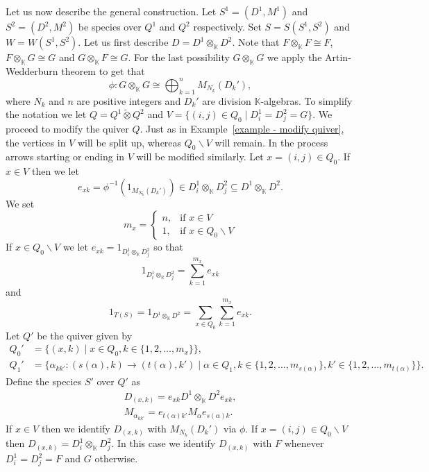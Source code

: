 \documentclass[a4paper, reqno]{amsart}
\theoremstyle{definition}
\newcommand{\K}{\mathbb{K}}
\begin{document}
Let us now describe the general construction. Let $S^1 = (D^1, M^1)$ and $S^2 = (D^2, M^2)$ be species over $Q^1$ and $Q^2$ respectively. Set $S = S(S^1, S^2)$ and $W = W(S^1, S^2)$. Let us first describe $D = D^1\otimes_\K D^2$. Note that $F\otimes_\K F \cong F$, $F\otimes_\K G\cong G$ and $G\otimes_\K F\cong G$. For the last possibility $G\otimes_\K G$ we apply the Artin-Wedderburn theorem to get that
\begin{equation*}
	\phi: G\otimes_\K G \cong \bigoplus_{k=1}^nM_{N_k}(D_k'),
\end{equation*}
where $N_k$ and $n$ are positive integers and $D_k'$ are division $\K$-algebras. To simplify the notation we let $Q = Q^1\tilde{\otimes}Q^2$ and $V = \{(i, j)\in Q_0 \mid D_i^1 = D_j^2 = G\}$. We proceed to modify the quiver $Q$. Just as in Example~\ref{example - modify quiver}, the vertices in $V$ will be split up, whereas $Q_0\backslash V$ will remain. In the process arrows starting or ending in $V$ will be modified similarly. Let $x = (i, j)\in Q_0$. If $x\in V$ then we let
\begin{equation*}
	e_{xk} = \phi^{-1}(1_{M_{N_k}(D_k')}) \in D_i^1\otimes_\K D_j^2 \subseteq D^1\otimes_\K D^2.
\end{equation*}
We set
\begin{equation*}
	m_x = \begin{cases}
		n, & \text{if } x\in V \\
		1, & \text{if } x\in Q_0\backslash V
	\end{cases}
\end{equation*}
If $x \in Q_0 \backslash V$ we let $e_{xk} = 1_{D_i^1\otimes_\K D_j^2}$ so that
\begin{equation*}
	1_{D_i^1\otimes_\K D_j^2} = \sum_{k=1}^{m_x}e_{xk}
\end{equation*}
and
\begin{equation*}
	1_{T(S)} = 1_{D^1\otimes_\K D^2} = \sum_{x\in Q_0}\sum_{k=1}^{m_x}e_{xk}.
\end{equation*}
Let $Q'$ be the quiver given by
\begin{equation*}
	\begin{aligned}
		Q_0' &= \{(x, k) \mid x\in Q_0, k\in \{1, 2, \dots, m_x\} \}, \\
		Q_1' &= \{\alpha_{kk'}: (s(\alpha), k) \to (t(\alpha), k') \mid \alpha\in Q_1, k\in \{1, 2, \dots, m_{s(\alpha)}\}, k'\in \{1, 2, \dots, m_{t(\alpha)}\} \}.
	\end{aligned}
\end{equation*}
Define the species $S'$ over $Q'$ as
\begin{equation*}
	\begin{aligned}
		D_{(x, k)} = e_{xk}D^1\otimes_\K D^2 e_{xk}, \\
		M_{\alpha_{kk'}} = e_{t(\alpha)k'}M_\alpha e_{s(\alpha)k}.
	\end{aligned}
\end{equation*}
If $x\in V$ then we identify $D_{(x, k)}$ with $M_{N_k}(D_k')$ via $\phi$. If $x = (i, j)\in Q_0\backslash V$ then $D_{(x, k)} = D_i^1\otimes_\K D_j^2$. In this case we identify $D_{(x, k)}$ with $F$ whenever $D_i^1 = D_j^2 = F$ and $G$ otherwise.
\end{document}
